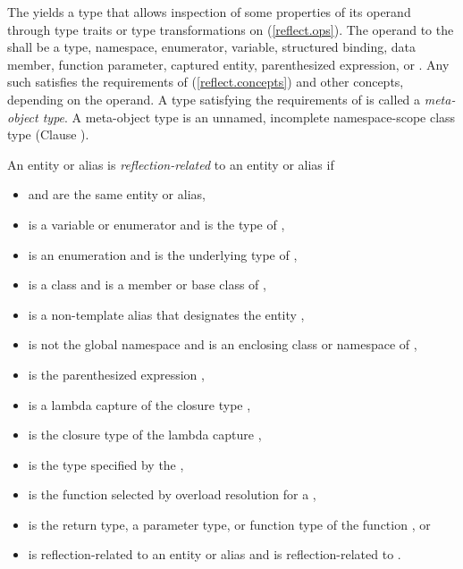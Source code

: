 \begin{std.txt}\color{addclr}

    \pnum
    The  yields a type  that allows
    inspection of some properties of its operand through type traits or type
    transformations on  (\ref{reflect.ops}).  The operand to the
     shall be a type, namespace, enumerator,
    variable, structured binding, data member, function parameter, captured
    entity, parenthesized expression,  or
    .  Any such  satisfies the requirements of
     (\ref{reflect.concepts}) and other 
    concepts, depending on the operand.  A type satisfying the requirements of
     is called a \emph{meta-object type}.  A meta-object
    type is an unnamed, incomplete namespace-scope class type (Clause ).

    \pnum
    An entity or alias  is \emph{reflection-related} to an entity or
    alias  if

    \begin{itemize}
      \item {} and  are the same entity or alias,
      \item {} is a variable or enumerator and  is the type of ,
      \item {} is an enumeration and  is the underlying type of ,
      \item {} is a class and  is a member or base class of ,
      \item {} is a non-template alias that designates the entity ,
      \item {} is not the global namespace and  is an enclosing class or namespace of ,
      \item {} is the parenthesized expression ,
      \item {} is a lambda capture of the closure type ,
      \item {} is the closure type of the lambda capture ,
      \item {} is the type specified by the  ,
      \item {} is the function selected by overload resolution for a  ,
      \item {} is the return type, a parameter type, or function type of the function , or
      \item {} is reflection-related to an entity or alias  and  is reflection-related to .
    \end{itemize}


\end{std.txt}
